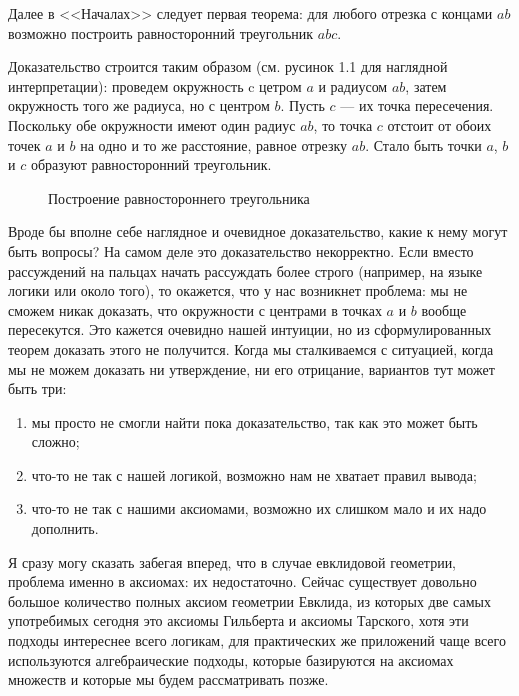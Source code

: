 Далее в <<Началах>> следует первая теорема: для любого отрезка с концами $ab$ возможно построить равносторонний треугольник $abc$.

Доказательство строится таким образом (см. русинок 1.1 для наглядной интерпретации): проведем окружность c цетром $a$ и радиусом $ab$, затем окружность того же радиуса, но с центром $b$. Пусть $c$ --- их точка пересечения. Поскольку обе окружности имеют один радиус $ab$, то точка $c$ отстоит от обоих точек $a$ и $b$ на одно и то же расстояние, равное отрезку $ab$. Стало быть точки $a$, $b$ и $c$ образуют равносторонний треугольник.

\begin{figure}[h]
\centering
{}
\caption{Построение равностороннего треугольника}
\end{figure}

Вроде бы вполне себе наглядное и очевидное доказательство, какие к нему могут быть вопросы? На самом деле это доказательство некорректно. Если вместо рассуждений на пальцах начать рассуждать более строго (например, на языке логики или около того), то окажется, что у нас возникнет проблема: мы не сможем никак доказать, что окружности с центрами в точках $a$ и $b$ вообще пересекутся. Это кажется очевидно нашей интуиции, но из сформулированных теорем доказать этого не получится. Когда мы сталкиваемся с ситуацией, когда мы не можем доказать ни утверждение, ни его отрицание, вариантов тут может быть три:

\begin{enumerate}
\item мы просто не смогли найти пока доказательство, так как это может быть сложно;
\item что-то не так с нашей логикой, возможно нам не хватает правил вывода;
\item что-то не так с нашими аксиомами, возможно их слишком мало и их надо дополнить.
\end{enumerate}

Я сразу могу сказать забегая вперед, что в случае евклидовой геометрии, проблема именно в аксиомах: их недостаточно. Сейчас существует довольно большое количество полных аксиом геометрии Евклида, из которых две самых употребимых сегодня это аксиомы Гильберта и аксиомы Тарского, хотя эти подходы интереснее всего логикам, для практических же приложений чаще всего используются алгебраические подходы, которые базируются на аксиомах множеств и которые мы будем рассматривать позже.

